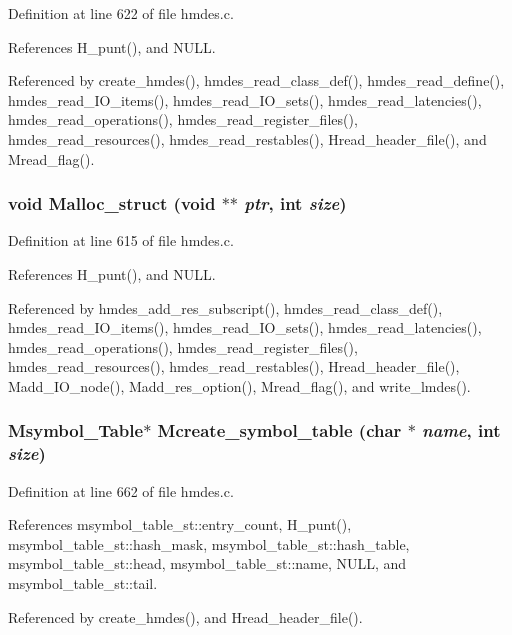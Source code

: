 Definition at line 622 of file hmdes.c.

References H\_\-punt(), and NULL.

Referenced by create\_\-hmdes(), hmdes\_\-read\_\-class\_\-def(), hmdes\_\-read\_\-define(), hmdes\_\-read\_\-IO\_\-items(), hmdes\_\-read\_\-IO\_\-sets(), hmdes\_\-read\_\-latencies(), hmdes\_\-read\_\-operations(), hmdes\_\-read\_\-register\_\-files(), hmdes\_\-read\_\-resources(), hmdes\_\-read\_\-restables(), Hread\_\-header\_\-file(), and Mread\_\-flag().
\subsubsection{\setlength{\rightskip}{0pt plus 5cm}void Malloc\_\-struct (void $\ast$$\ast$ {\em ptr}, int {\em size})}\label{hmdes_8c_44598a63bd3f29a90fdd27cb3531aff7}




Definition at line 615 of file hmdes.c.

References H\_\-punt(), and NULL.

Referenced by hmdes\_\-add\_\-res\_\-subscript(), hmdes\_\-read\_\-class\_\-def(), hmdes\_\-read\_\-IO\_\-items(), hmdes\_\-read\_\-IO\_\-sets(), hmdes\_\-read\_\-latencies(), hmdes\_\-read\_\-operations(), hmdes\_\-read\_\-register\_\-files(), hmdes\_\-read\_\-resources(), hmdes\_\-read\_\-restables(), Hread\_\-header\_\-file(), Madd\_\-IO\_\-node(), Madd\_\-res\_\-option(), Mread\_\-flag(), and write\_\-lmdes().
\subsubsection{\setlength{\rightskip}{0pt plus 5cm}\bf{Msymbol\_\-Table}$\ast$ Mcreate\_\-symbol\_\-table (char $\ast$ {\em name}, int {\em size})}\label{hmdes_8c_9a7308042188883a4be25b3e0ee777d0}




Definition at line 662 of file hmdes.c.

References msymbol\_\-table\_\-st::entry\_\-count, H\_\-punt(), msymbol\_\-table\_\-st::hash\_\-mask, msymbol\_\-table\_\-st::hash\_\-table, msymbol\_\-table\_\-st::head, msymbol\_\-table\_\-st::name, NULL, and msymbol\_\-table\_\-st::tail.

Referenced by create\_\-hmdes(), and Hread\_\-header\_\-file().
